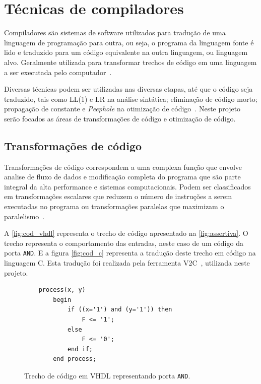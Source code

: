 \section{Técnicas de compiladores}
\par
Compiladores são sistemas de software utilizados para tradução de uma linguagem de programação para outra, ou seja, o programa da linguagem fonte é lido e traduzido para um código equivalente na outra linguagem, ou linguagem alvo. Geralmente utilizada para transformar trechos de código em uma linguagem a ser executada pelo computador~\cite{aho2007compilers}. 

\par
Diversas técnicas podem ser utilizadas nas diversas etapas, até que o código seja traduzido, tais como LL(1) e LR na análise sintática; eliminação de código morto; propagação de constante e \textit{Peephole} na otimização de código~\cite{aho2007compilers}. Neste projeto serão focados as áreas de transformações de código e otimização de código.

\subsection{Transformações de código}
\par
Transformações de código correspondem a uma complexa função que envolve analise de fluxo de dados e modificação completa do programa que são parte integral da alta performance e sistemas computacionais. Podem ser classificados em transformações escalares que reduzem o número de instruções a serem executadas no programa ou transformações paralelas que maximizam o paralelismo~\cite{srikant2002compiler}.

\par
A \autoref{fig:cod_vhdl} representa o trecho de código apresentado na \autoref{fig:assertiva}. O trecho representa o comportamento das entradas, neste caso de um código da porta \texttt{AND}. E a figura \autoref{fig:cod_c} representa a tradução deste trecho em código na linguagem C. Esta tradução foi realizada pela ferramenta V2C~\cite{albertoV2C}, utilizada neste projeto.

\begin{figure}[thp]
\caption{\label{fig:cod_vhdl} Trecho de código em VHDL representando porta \texttt{AND}.}
	\begin{center}
    \begin{minipage}{0.9\textwidth}
    \begin{lstlisting}       
	process(x, y)
    	begin
        	if ((x='1') and (y='1')) then
            	F <= '1';
        	else
            	F <= '0';
        	end if;
    	end process;
\end{lstlisting}
    \end{minipage}
	\end{center}
\end{figure}

